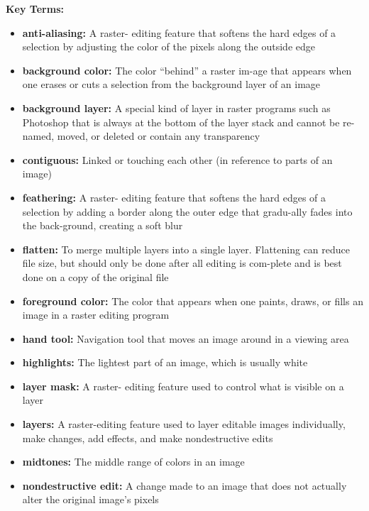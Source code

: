 \documentclass{report}
\begin{document}
    \bigbreak \bigbreak \noindent
    \begin{Large}
        \textbf{Key Terms:}
    \end{Large}
    \bigbreak \noindent
    \begin{itemize}
        \item \textbf{anti-aliasing:} A raster- editing feature that softens the hard edges of a selection by adjusting the color of the pixels along the outside edge
        \item \textbf{background color:} The color “behind” a raster im-age that appears when one erases or cuts a selection from the background layer of an image
        \item \textbf{background layer:} A special kind of layer in raster programs such as  Photoshop that is always at the bottom of the layer  stack and cannot be re-named, moved, or deleted or contain any transparency
        \item \textbf{contiguous:} Linked or touching each other (in  reference to parts of an image)
        \item \textbf{feathering:} A raster- editing feature that softens the hard edges of a selection by adding a border along the outer edge that gradu-ally fades into the back-ground, creating a soft blur
        \item \textbf{flatten:} To merge multiple layers into a single layer. Flattening can reduce file size, but should only be done after all editing is com-plete and is best done on a copy of the original file
        \item \textbf{foreground color:} The color that appears when one paints, draws, or fills an image in a raster editing program
        \item \textbf{hand tool:} Navigation tool that moves an image around in a viewing area
        \item \textbf{highlights:} The lightest part of an image, which is usually white
        \item \textbf{layer mask:} A raster- editing feature used to  control what is visible on  a layer
        \item \textbf{layers:} A raster-editing  feature used to layer  editable images individually, make changes, add effects, and make nondestructive edits
        \item \textbf{midtones:} The middle range of colors in an image
        \item \textbf{nondestructive edit:} A change made to an image that does not actually alter the original image’s pixels

\end{itemize}
\end{document}

